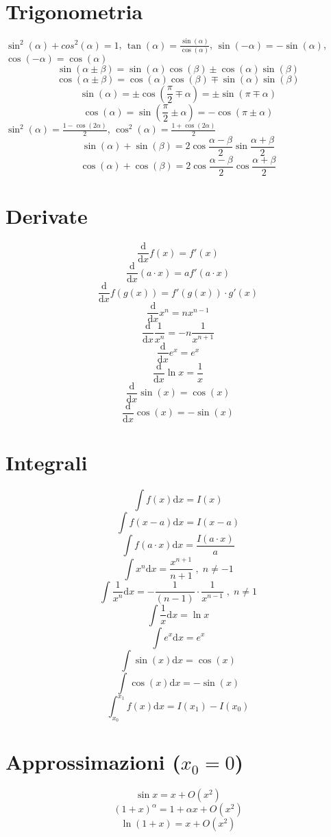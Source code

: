 \documentclass{article}
\begin{document}
\begin{small}
\begin{multicols}{3}
\section{Trigonometria}
		$ \sin^2 ( \alpha ) + cos^2 ( \alpha ) = 1 $, $ \tan ( \alpha ) = \frac{ \sin ( \alpha ) }{ \cos ( \alpha ) } $,
		$ \sin ( - \alpha ) = - \sin ( \alpha ) $, $ \cos ( - \alpha ) = \cos ( \alpha ) $
		\[ \sin ( \alpha \pm \beta ) = \sin ( \alpha ) \cos ( \beta ) \pm \cos ( \alpha ) \sin ( \beta ) \]
		\[ \cos ( \alpha \pm \beta ) = \cos ( \alpha ) \cos ( \beta ) \mp \sin ( \alpha ) \sin ( \beta ) \]
		\[ \sin ( \alpha ) = \pm \cos ( \frac{ \pi }{2} \mp \alpha ) = \pm \sin ( \pi \mp \alpha ) \]
		\[ \cos ( \alpha ) = \sin ( \frac{ \pi }{2} \pm \alpha ) = - \cos ( \pi \pm \alpha ) \]
		$ \sin^2 ( \alpha ) = \frac{ 1 - \cos ( 2 \alpha ) }{2} $, $ \cos^2 ( \alpha ) = \frac{ 1 + \cos ( 2 \alpha ) }{2} $
		\[ \sin ( \alpha ) + \sin ( \beta ) = 2 \cos \frac{ \alpha - \beta }{2} \sin \frac{ \alpha + \beta }{2} \]
		\[ \cos ( \alpha ) + \cos ( \beta ) = 2 \cos \frac{ \alpha - \beta }{2} \cos \frac{ \alpha + \beta }{2} \]
\section{Derivate}
		\[ \frac{ \mathrm d }{ \mathrm d x} f ( x ) = f' ( x ) \]
		\[ \frac{ \mathrm d }{ \mathrm d x} ( a \cdot x ) = a f' ( a \cdot x ) \]
		\[ \frac{ \mathrm d }{ \mathrm d x} f ( g ( x ) ) = f' ( g ( x ) ) \cdot g' ( x ) \]
		\[ \frac{ \mathrm d }{ \mathrm d x} x^n = n x^{n-1} \]
		\[ \frac{ \mathrm d }{ \mathrm d x} \frac{1}{ x^n } = - n \frac{1}{ x^{n+1} } \]
		\[ \frac{ \mathrm d }{ \mathrm d x} e^x = e^x \]
		\[ \frac{ \mathrm d }{ \mathrm d x} \ln x = \frac{1}{ x } \]
		\[ \frac{ \mathrm d }{ \mathrm d x} \sin ( x ) = \cos ( x ) \]
		\[ \frac{ \mathrm d }{ \mathrm d x} \cos ( x ) = - \sin ( x ) \]
\section{Integrali}
		\[ \int f ( x ) \mathrm d x = I ( x ) \]
		\[ \int f ( x - a ) \mathrm d x = I ( x - a ) \]
		\[ \int f ( a \cdot x ) \mathrm d x = \frac{ I (a \cdot x) }{ a } \]
		\[ \int x^n \mathrm d x = \frac{ x^{n+1} }{ n+1 } \;,\; n \neq -1 \]
		\[ \int \frac{1}{ x^n } \mathrm d x = - \frac{1}{ ( n-1 ) } \cdot \frac{1}{ x^{n-1} } \;,\; n \neq 1 \]
		\[ \int \frac{1}{ x } \mathrm d x = \ln x \]
		\[ \int e^x \mathrm d x = e^x \]
		\[ \int \sin ( x ) \mathrm d x = \cos ( x ) \]
		\[ \int \cos ( x ) \mathrm d x = - \sin ( x ) \]
		\[ \int_{x_0}^{x_1} f ( x ) \mathrm d x = I ( x_1 ) - I ( x_0 ) \]
\section{Approssimazioni ($x_0 = 0$)}
		\[ \sin x = x + O ( x^2 ) \]
		\[ ( 1 + x )^{\alpha} = 1 + \alpha x + O ( x^2 ) \]
		\[ \ln ( 1 + x ) = x + O ( x^2 ) \]

	\end{multicols}
	\end{small}
\end{document}
